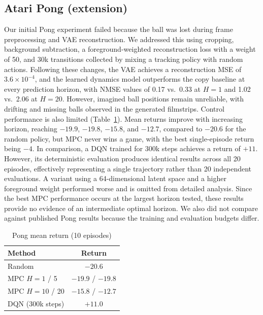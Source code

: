 \documentclass[conference]{IEEEtran}
\begin{document}
\subsection{Atari Pong (extension)}
Our initial Pong experiment failed because the ball was lost during frame preprocessing and VAE reconstruction. We addressed this using cropping, background subtraction, a foreground-weighted reconstruction loss with a weight of 50, and 30k transitions collected by mixing a tracking policy with random actions. Following these changes, the VAE achieves a reconstruction MSE of $3.6\times10^{-4}$, and the learned dynamics model outperforms the copy baseline at every prediction horizon, with NMSE values of 0.17 vs.\ 0.33 at $H{=}1$ and 1.02 vs.\ 2.06 at $H{=}20$. However, imagined ball positions remain unreliable, with drifting and missing balls observed in the generated filmstrips. Control performance is also limited (Table~\ref{tab:pong}). Mean returns improve with increasing horizon, reaching $-19.9$, $-19.8$, $-15.8$, and $-12.7$, compared to $-20.6$ for the random policy, but MPC never wins a game, with the best single-episode return being $-4$. In comparison, a DQN trained for 300k steps achieves a return of $+11$. However, its deterministic evaluation produces identical results across all 20 episodes, effectively representing a single trajectory rather than 20 independent evaluations. A variant using a 64-dimensional latent space and a higher foreground weight performed worse and is omitted from detailed analysis. Since the best MPC performance occurs at the largest horizon tested, these results provide no evidence of an intermediate optimal horizon. We also did not compare against published Pong results because the training and evaluation budgets differ.

\begin{table}[t]
\caption{Pong mean return (10 episodes)}
\label{tab:pong}
\centering
\begin{tabular}{@{}lc@{}}
\toprule
Method & Return \\
\midrule
Random & $-20.6$ \\
MPC $H{=}1$ / 5 & $-19.9$ / $-19.8$ \\
MPC $H{=}10$ / 20 & $-15.8$ / $-12.7$ \\
DQN (300k steps) & $+11.0$ \\
\bottomrule
\end{tabular}
\end{table}
\end{document}
